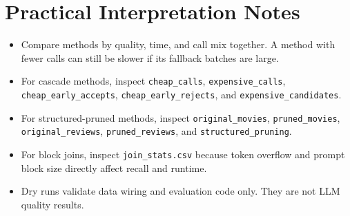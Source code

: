 \documentclass[11pt,oneside]{book}
\begin{document}
\chapter{Practical Interpretation Notes}
\begin{itemize}
\item Compare methods by quality, time, and call mix together. A method with fewer
calls can still be slower if its fallback batches are large.
\item For cascade methods, inspect \texttt{cheap\_calls}, \texttt{expensive\_calls},
\texttt{cheap\_early\_accepts}, \texttt{cheap\_early\_rejects}, and \texttt{expensive\_candidates}.
\item For structured-pruned methods, inspect \texttt{original\_movies}, \texttt{pruned\_movies},
\texttt{original\_reviews}, \texttt{pruned\_reviews}, and \texttt{structured\_pruning}.
\item For block joins, inspect \texttt{join\_stats.csv} because token overflow and prompt
block size directly affect recall and runtime.
\item Dry runs validate data wiring and evaluation code only. They are not LLM
quality results.
\end{itemize}
\end{document}
